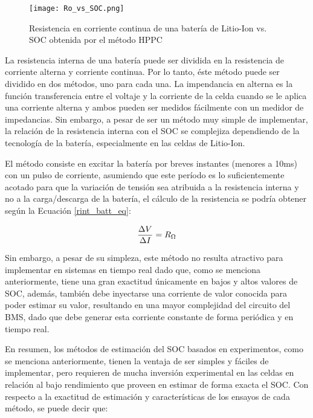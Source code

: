\begin{figure}[h]
    \begin{center}
	\texttt{[image: Ro\_vs\_SOC.png]}
	\caption{Resistencia en corriente continua de una batería de Litio-Ion vs. 
        SOC obtenida por el m\'etodo HPPC}
	\label{res_int_graph}
    \end{center}
\end{figure}

\noindent La resistencia interna de una bater\'ia puede ser dividida en la
resistencia de corriente alterna y corriente continua. Por lo tanto,
\'este m\'etodo puede ser dividido en dos m\'etodos, uno para cada una. 
La impendancia en alterna es la funci\'on transferencia entre el
voltaje y la corriente de la celda cuando se le aplica una corriente
alterna y ambos pueden ser medidos f\'acilmente con un medidor de impedancias. 
Sin embargo, a pesar de ser un m\'etodo muy simple de implementar, la relaci\'on 
de la resistencia interna con el SOC se complejiza dependiendo de la 
tecnolog\'ia de la bater\'ia, especialmente en las celdas de Litio-Ion.

\noindent El m\'etodo consiste en excitar la bater\'ia por breves instantes 
(menores a 10ms) con un pulso de corriente, asumiendo que este per\'iodo es lo 
suficientemente acotado para que la variaci\'on de tensi\'on sea atribuida a la 
resistencia interna y no a la carga/descarga de la bater\'ia, el c\'alculo de la 
resistencia se podr\'ia obtener seg\'un la Ecuaci\'on \ref{rint_batt_eq}:

\begin{equation}
    \frac{\Delta V}{\Delta I} = R_{\ohm} \label{rint_batt_eq}
\end{equation}

Sin embargo, a pesar de su simpleza, este m\'etodo no resulta atractivo para
implementar en sistemas en tiempo real dado que, como se menciona anteriormente,
tiene una gran exactitud \'unicamente en bajos y altos valores de \acrshort{SOC},
adem\'as, tambi\'en debe inyectarse una corriente de valor conocida para poder
estimar su valor, resultando en una mayor complejidad del circuito del
\acrshort{BMS}, dado que debe generar esta corriente constante de forma
peri\'odica y en tiempo real.

\noindent En resumen, los m\'etodos de estimaci\'on del \acrshort{SOC} basados
en experimentos, como se menciona anteriormente, tienen la ventaja de ser 
simples y f\'aciles de implementar, pero requieren de mucha inversi\'on 
experimental en las celdas en relaci\'on al bajo rendimiento que proveen en 
estimar de forma exacta el \acrshort{SOC}. Con respecto a la exactitud de 
estimaci\'on y caracter\'isticas de los ensayos de cada m\'etodo, se puede decir 
que:

